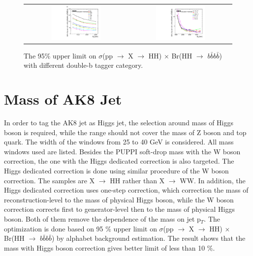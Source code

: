 \begin{figure}[t]
  \centering
  \begin{tabular}{cc}
    \includegraphics[width=0.5\textwidth]{Figures/BDTLimit.pdf} &
    \includegraphics[width=0.5\textwidth]{Figures/BDTLimitcombine.pdf}
  \end{tabular}
  \caption{The 95$\% $ upper limit on $\sigma$(pp $\rightarrow$ X $\rightarrow$ HH) $\times$ Br(HH $\rightarrow$ $b\bar{b}b\bar{b}$) with different double-b tagger category.}

\end{figure}

\clearpage
\section{Mass of AK8 Jet}
In order to tag the AK8 jet as Higgs jet, the selection around mass of Higgs boson is required, while the range should not cover the mass of Z boson and top quark. The width of the windows from 25 to 40 GeV is considered. All mass windows used are listed. Besides the PUPPI soft-drop mass with the W boson correction, the one with the Higgs dedicated correction is also targeted. The Higgs dedicated correction is done using similar procedure of the W boson correction. The samples are X $\rightarrow$ HH rather than X $\rightarrow$ WW. In addition, the Higgs dedicated correction uses one-step correction, which correction the mass of reconstruction-level to the mass of physical Higgs boson, while the W boson correction corrects first to generator-level then to the mass of physical Higgs boson. Both of them remove the dependence of the mass on jet p$_{T}$. The optimization is done based on 95 $\% $ upper limit on $\sigma$(pp $\rightarrow$ X $\rightarrow$ HH) $\times$ Br(HH $\rightarrow$ $b\bar{b}b\bar{b}$) by alphabet background estimation. The result shows that the mass with Higgs boson correction gives better limit of less than 10 $\% $.

